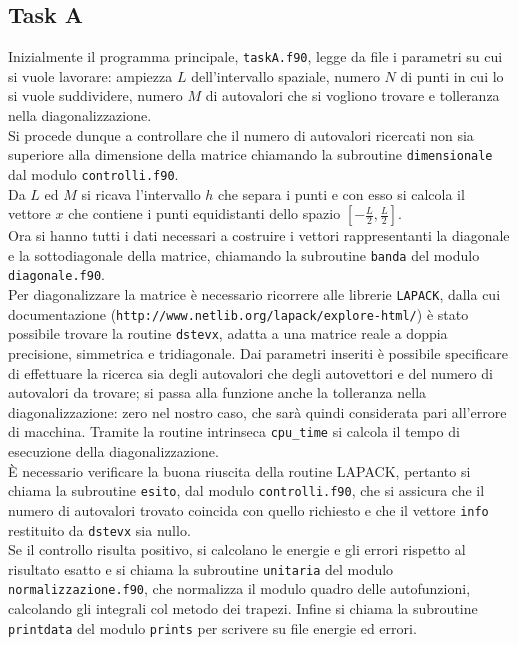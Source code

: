 \documentclass[a4paper,11pt]{article}
\begin{document}
\subsection*{Task A}
Inizialmente il programma principale, {\tt taskA.f90}, legge da file i parametri su cui si vuole lavorare: ampiezza $L$ dell'intervallo spaziale, numero $N$ di punti in cui lo si vuole suddividere, numero $M$ di autovalori che si vogliono trovare e tolleranza nella diagonalizzazione. \\
Si procede dunque a controllare che il numero di autovalori ricercati non sia superiore alla dimensione della matrice chiamando la subroutine {\tt dimensionale} dal modulo {\tt controlli.f90}. \\
Da $L$ ed $M$ si ricava l'intervallo $h$ che separa i punti e con esso si calcola il vettore $x$ che contiene i punti equidistanti dello spazio $\left[ -\frac{L}{2}, \frac{L}{2}\right]$. \\
Ora si hanno tutti i dati necessari a costruire i vettori rappresentanti la diagonale e la sottodiagonale della matrice, chiamando la subroutine {\tt banda} del modulo {\tt diagonale.f90}. \\ 
Per diagonalizzare la matrice è necessario ricorrere alle librerie {\tt LAPACK}, dalla cui documentazione ({\tt http://www.netlib.org/lapack/explore-html/}) è stato possibile trovare la routine {\tt dstevx}, adatta a una matrice reale a doppia precisione, simmetrica e tridiagonale. Dai parametri inseriti è possibile specificare di effettuare la ricerca sia degli autovalori che degli autovettori e del numero di autovalori da trovare; si passa alla funzione anche la tolleranza nella diagonalizzazione: zero nel nostro caso, che sarà quindi considerata pari all'errore di macchina. Tramite la routine intrinseca {\tt cpu\_time} si calcola il tempo di esecuzione della diagonalizzazione.\\
È necessario verificare la buona riuscita della routine LAPACK, pertanto si chiama la subroutine {\tt esito}, dal modulo {\tt controlli.f90}, che si assicura che il numero di autovalori trovato coincida con quello richiesto e che il vettore {\tt info} restituito da {\tt dstevx} sia nullo. \\
Se il controllo risulta positivo, si calcolano le energie e gli errori rispetto al risultato esatto e si chiama la subroutine {\tt unitaria} del modulo {\tt normalizzazione.f90}, che normalizza il modulo quadro delle autofunzioni, calcolando gli integrali col metodo dei trapezi. Infine si chiama la subroutine {\tt printdata} del modulo {\tt prints} per scrivere su file energie ed errori.
\end{document}
